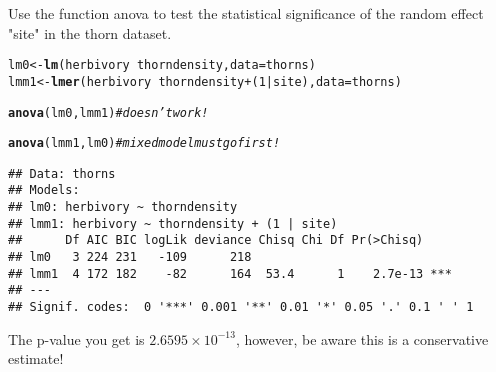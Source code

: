 \documentclass[12pt,a4paper]{scrartcl}\usepackage[]{graphicx}\usepackage[]{color}
\makeatletter
\newcommand{\hlnum}[1]{\textcolor[rgb]{0.686,0.059,0.569}{#1}}%
\newcommand{\hlcom}[1]{\textcolor[rgb]{0.678,0.584,0.686}{\textit{#1}}}%
\newcommand{\hlopt}[1]{\textcolor[rgb]{0,0,0}{#1}}%
\newcommand{\hlstd}[1]{\textcolor[rgb]{0.345,0.345,0.345}{#1}}%
\newcommand{\hlkwb}[1]{\textcolor[rgb]{0.69,0.353,0.396}{#1}}%
\newcommand{\hlkwc}[1]{\textcolor[rgb]{0.333,0.667,0.333}{#1}}%
\newcommand{\hlkwd}[1]{\textcolor[rgb]{0.737,0.353,0.396}{\textbf{#1}}}%
\newenvironment{kframe}{%
 \def\at@end@of@kframe{}%
 \ifinner\ifhmode%
  \def\at@end@of@kframe{\end{minipage}}%
  \begin{minipage}{\columnwidth}%
 \fi\fi%
 \def\FrameCommand##1{\hskip\@totalleftmargin \hskip-\fboxsep
 \colorbox{shadecolor}{##1}\hskip-\fboxsep
     \hskip-\linewidth \hskip-\@totalleftmargin \hskip\columnwidth}%
 \MakeFramed {\advance\hsize-\width
   \@totalleftmargin\z@ \linewidth\hsize
   \@setminipage}}%
 {\par\unskip\endMakeFramed%
 \at@end@of@kframe}
\newenvironment{knitrout}{}{} %
\makeatother
\begin{document}
\begin{Exercise}[difficulty=1, title={Testing variance components in lme4}]
Use the function anova to test the statistical significance of the random effect "site" in the thorn dataset. 
\end{Exercise}
\begin{Answer}
\begin{knitrout}
\color{fgcolor}\begin{kframe}
\begin{alltt}
\hlstd{lm0} \hlkwb{<-} \hlkwd{lm}\hlstd{(herbivory} \hlopt{~} \hlstd{thorndensity ,} \hlkwc{data}\hlstd{=thorns)}
\hlstd{lmm1} \hlkwb{<-} \hlkwd{lmer}\hlstd{(herbivory} \hlopt{~} \hlstd{thorndensity} \hlopt{+} \hlstd{(}\hlnum{1}\hlopt{|}\hlstd{site),} \hlkwc{data}\hlstd{=thorns)}

\hlkwd{anova}\hlstd{(lm0, lmm1)}\hlcom{#doesn't work!}
\end{alltt}


{\ttfamily\noindent\bfseries\color{errorcolor}{\#\# Error: \$ operator not defined for this S4 class}}\begin{alltt}
\hlkwd{anova}\hlstd{(lmm1, lm0)}\hlcom{# mixed model must go first!}
\end{alltt}


{\ttfamily\noindent\itshape\color{messagecolor}{\#\# refitting model(s) with ML (instead of REML)}}\begin{verbatim}
## Data: thorns
## Models:
## lm0: herbivory ~ thorndensity
## lmm1: herbivory ~ thorndensity + (1 | site)
##      Df AIC BIC logLik deviance Chisq Chi Df Pr(>Chisq)    
## lm0   3 224 231   -109      218                            
## lmm1  4 172 182    -82      164  53.4      1    2.7e-13 ***
## ---
## Signif. codes:  0 '***' 0.001 '**' 0.01 '*' 0.05 '.' 0.1 ' ' 1
\end{verbatim}
\end{kframe}
\end{knitrout}
The p-value you get is \ensuremath{2.6595\times 10^{-13}}, however, be aware this is a conservative estimate!
\end{Answer}
\end{document}
